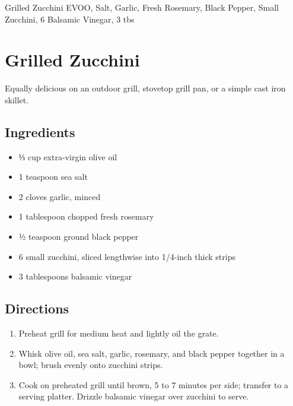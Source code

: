 Grilled Zucchini
  EVOO, 
  Salt, 
  Garlic, 
  Fresh Rosemary, 
  Black Pepper, 
  Small Zucchini, 6
  Balsamic Vinegar, 3 tbs

\section{ Grilled Zucchini }

Equally delicious on an outdoor grill, stovetop grill pan, or a simple cast iron skillet. 

\subsection{ Ingredients }

\begin{itemize}
  \item ⅓ cup extra-virgin olive oil
  \item 1 teaspoon sea salt
  \item 2 cloves garlic, minced
  \item 1 tablespoon chopped fresh rosemary
  \item ½ teaspoon ground black pepper
  \item 6 small zucchini, sliced lengthwise into 1/4-inch thick strips
  \item 3 tablespoons balsamic vinegar
\end{itemize}

\subsection{ Directions }

\begin{enumerate}
  \item Preheat grill for medium heat and lightly oil the grate.

  \item Whisk olive oil, sea salt, garlic, rosemary, and black pepper together in a bowl; brush evenly onto zucchini strips.

  \item Cook on preheated grill until brown, 5 to 7 minutes per side; transfer to a serving platter. Drizzle balsamic vinegar over zucchini to serve.
\end{enumerate}
